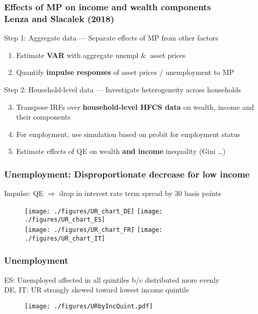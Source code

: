 \documentclass[pdflatex,aspectratio=169]{beamer}
\newcommand{\jemph}[1]{{\color{StataDarkBlue}#1}}
\newcommand{\jbemph}[1]{\textbf{\color{SlideNavy}#1}}
\begin{document}
\begin{frame}\frametitle{\bf Effects of MP on income and wealth components\\ \normalsize{Lenza and Slacalek (2018)}}

\jemph{Step 1: Aggregate data --- Separate effects of MP from other factors}
\renewcommand*{\theenumi}{\alph{enumi}}
\begin{enumerate}
\item Estimate \jbemph{VAR} with aggregate unempl \&\ asset prices
\item Quantify \jbemph{impulse responses} of asset prices / unemployment to MP\\[5mm] {}
\end{enumerate}
\jemph{Step 2: Household-level data --- Investigate heterogeneity across households}
\begin{enumerate}
\setcounter{enumi}{2}
\item Transpose IRFs over \jbemph{household-level HFCS data} on wealth, income and their components
\item For employment, use simulation based on probit for employment status
\item Estimate effects of QE on wealth \jbemph{and income} inequality (Gini \dots)
\end{enumerate}
\renewcommand*{\theenumii}{\Num{enumi}}

\end{frame}


\begin{frame}\frametitle{\bf Unemployment: Disproportionate decrease for low income}
Impulse: QE $\Rightarrow$ drop in interest rate term spread \jemph{by 30 basis points}
\begin{figure}
\begin{center}
\texttt{[image: ./figures/UR\_chart\_DE]}
\texttt{[image: ./figures/UR\_chart\_ES]}\\
\texttt{[image: ./figures/UR\_chart\_FR]}
\texttt{[image: ./figures/UR\_chart\_IT]}
\end{center}
\end{figure}

\end{frame}


\begin{frame}\frametitle{\bf Unemployment}
ES: Unemployed affected in all quintiles b/c distributed more evenly\\
DE, IT: UR strongly skewed toward lowest income quintile
\begin{figure}
\begin{center}
\texttt{[image: ./figures/URbyIncQuint.pdf]}
\end{center}
\end{figure}
\end{frame}
\end{document}
